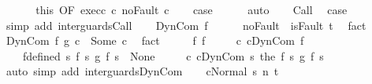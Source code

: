 \begin{isabellebody}
\ \ \isacommand{{\isacharbraceright}}\isamarkupfalse%
\isanewline
\ \ \isamarkupfalse%
\ this\ {\isacharbrackleft}OF\ exec{\isacharunderscore}c\ c\ noFault{\isacharbrackright}\ c{}\isanewline
\ \ \isamarkupfalse%
\ {\isacharquery}case\isanewline
\ \ \ \ \isamarkupfalse%
\ auto\isanewline
{}\isamarkupfalse%
\isanewline
\ \ \isamarkupfalse%
\ Call\ \isamarkupfalse%
\ {\isacharquery}case\ \isamarkupfalse%
\ {\isacharparenleft}simp\ add{\isacharcolon}\ inter{\isacharunderscore}guards{\isacharunderscore}Call{\isacharparenright}\isanewline
{}\isamarkupfalse%
\isanewline
\ \ \isamarkupfalse%
\ {\isacharparenleft}DynCom\ f{}{\isacharparenright}\ \ \isanewline
\ \ \isamarkupfalse%
\ noFault{\isacharcolon}\ {\isachardoublequoteopen}{\isasymnot}\ isFault\ t{\isachardoublequoteclose}\ \isamarkupfalse%
\ fact\isanewline
\ \ \isamarkupfalse%
\ {\isachardoublequoteopen}{\isacharparenleft}DynCom\ f{}\ {\isasyminter}\isactrlsub g\ c{}{\isacharparenright}\ {\isacharequal}\ Some\ c{\isachardoublequoteclose}\ \isamarkupfalse%
\ fact\isanewline
\ \ \isamarkupfalse%
\ \isamarkupfalse%
\ f{}\ f\ \isanewline
\ \ \ \ c{}{\isacharcolon}\ {\isachardoublequoteopen}c{}{\isacharequal}DynCom\ f{}{\isachardoublequoteclose}\ \isanewline
\ \ \ \ f{\isacharunderscore}defined{\isacharcolon}\ {\isachardoublequoteopen}{\isasymforall}s{\isachardot}\ {\isacharparenleft}{\isacharparenleft}f{}\ s{\isacharparenright}\ {\isasyminter}\isactrlsub g\ {\isacharparenleft}f{}\ s{\isacharparenright}{\isacharparenright}\ {\isasymnoteq}\ None{\isachardoublequoteclose}\ \isanewline
\ \ \ \ c{\isacharcolon}\ {\isachardoublequoteopen}c{\isacharequal}DynCom\ {\isacharparenleft}{\isasymlambda}s{\isachardot}\ the\ {\isacharparenleft}{\isacharparenleft}f{}\ s{\isacharparenright}\ {\isasyminter}\isactrlsub g\ {\isacharparenleft}f{}\ s{\isacharparenright}{\isacharparenright}{\isacharparenright}{\isachardoublequoteclose}\isanewline
\ \ \ \ \isamarkupfalse%
\ {\isacharparenleft}auto\ simp\ add{\isacharcolon}\ inter{\isacharunderscore}guards{\isacharunderscore}DynCom{\isacharparenright}\isanewline
\ \ \isamarkupfalse%
\ {\isachardoublequoteopen}{\isasymGamma}{\isasymturnstile}{\isasymlangle}c{\isacharcomma}Normal\ s{\isasymrangle}\ {\isacharequal}n{\isasymRightarrow}\ t{\isachardoublequoteclose}\ \isamarkupfalse%

\end{isabellebody}
